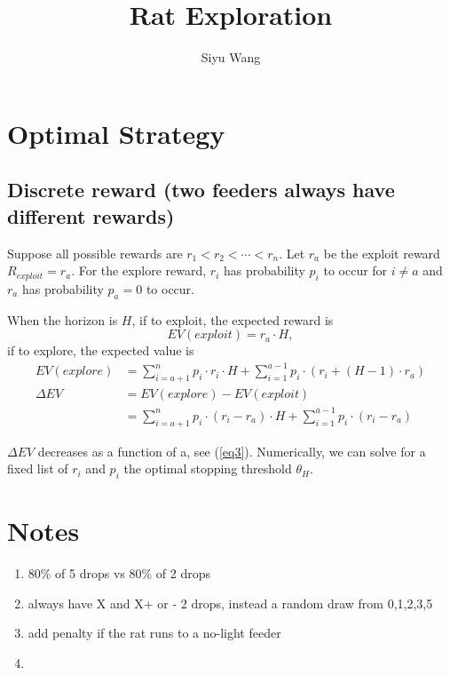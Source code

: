 \documentclass{article}
\title{Rat Exploration}
\author{Siyu Wang}
\date{ }
\begin{document}
\maketitle
\tableofcontents
\section{Optimal Strategy}
\subsection{Discrete reward (two feeders always have different rewards)}
Suppose all possible rewards are $r_1 < r_2 < \cdots <  r_n$. Let $r_a$ be the exploit reward $R_{exploit} = r_a$. For the explore reward, $r_i$ has probability $p_i$ to occur for $i\neq a$ and $r_a$ has probability $p_a = 0$ to occur.

When the horizon is $H$, if to exploit, the expected reward is $$EV(exploit) = r_a \cdot H,$$ if to explore, the expected value is 
\begin{align} \label{eq1}
EV(explore) & = \sum_{i = a+1}^{n} p_i \cdot r_i \cdot H + \sum_{i = 1}^{a-1} p_i \cdot (r_i + (H-1) \cdot r_a) \\ \label{eq2}
\Delta EV & = EV(explore) - EV(exploit)\\ \label{eq3}
& = \sum_{i = a+1}^{n} p_i \cdot (r_i - r_a) \cdot H + \sum_{i = 1}^{a-1}{p_i \cdot (r_i - r_a)}
\end{align}

$\Delta EV$ decreases as a function of a, see (\ref{eq3}). Numerically, we can solve for a fixed list of $r_i$ and $p_i$ the optimal stopping threshold $\theta_H$.

\section{Notes}
\begin{enumerate}
	\item 80\% of 5 drops vs 80\% of 2 drops
	\item always have X and X+ or - 2 drops, instead a random draw from 0,1,2,3,5
	\item add penalty if the rat runs to a no-light feeder
	\item 
\end{enumerate}
\end{document}
